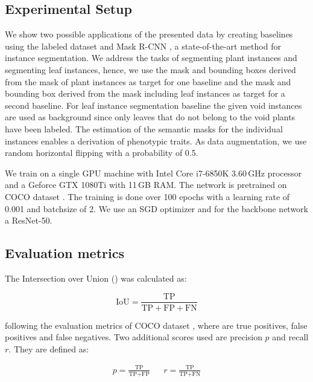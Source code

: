 \documentclass{article}
\begin{document}
\subsection{Experimental Setup}
We show two possible applications of the presented data by creating baselines using the labeled dataset  and Mask R-CNN \citep{he2017mask}, a state-of-the-art method for instance segmentation. We address the tasks of segmenting plant instances and segmenting leaf instances, hence, we use the mask and bounding boxes derived from the mask of plant instances as target for one baseline and the mask and bounding box derived from the mask including leaf instances as target for a second baseline. For leaf instance segmentation baseline the given void instances are used as background since only leaves that do not belong to the void plants have been labeled.
The estimation of the semantic masks for the individual instances enables a derivation of phenotypic traits. As data augmentation, we use random horizontal flipping with a probability of 0.5.

We train on a single GPU machine with Intel Core i7-6850K 3.60\,GHz processor and a Geforce GTX 1080Ti with 11\,GB RAM. The network is pretrained on COCO dataset \citep{lin2014microsoft}. The training is done over 100 epochs with a learning rate of 0.001 and batchsize of 2. We use an SGD optimizer and for the backbone network a ResNet-50. 






\subsection{Evaluation metrics}

The Intersection over Union () was calculated as: 

\begin{equation}
    \text{IoU} = \frac{\text{TP}}{\text{TP} + \text{FP} + \text{FN}}
\end{equation}

following the evaluation metrics of COCO dataset \citep{lin2014microsoft},
where  are true positives,  false positives and  false negatives. Two additional scores used are precision $p$ and recall $r$. They are defined as:

\begin{align}
    p = \frac{\text{TP}}{\text{TP} + \text{FP}} && r = \frac{\text{TP}}{\text{TP} + \text{FN}}
\end{align}
\end{document}
